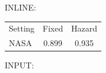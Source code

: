 \documentclass{article}
\begin{document}
INLINE:
\begin{tabular}{lcc}
Setting & Fixed & Hazard \\
NASA & 0.899 & 0.935 \\
\end{tabular}

INPUT:
\begin{tabular}{lcc}

\end{tabular}
\end{document}
